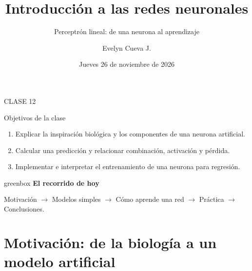 \documentclass[10pt,aspectratio=169,xcolor={dvipsnames}]{beamer}
\title[Clase 12 · Perceptrón lineal]{\bfseries Introducción a las redes neuronales}
\subtitle{Perceptrón lineal: de una neurona al aprendizaje}
\author[E. Cueva]{Evelyn Cueva J.}
\institute{Aprendizaje Automático Inicial · Ciencia de Datos}
\date[26 nov. 2026]{Jueves 26 de noviembre de 2026}
\newcommand{\tcg}[1]{\textcolor{verde}{#1}}
\newenvironment{caja}[1][lgraybox]{\begin{beamercolorbox}[sep=0.7em,wd=\linewidth]{#1}}{\end{beamercolorbox}}
\begin{document}
\begin{frame}[plain]
    \vspace{6mm}
    {\small CLASE 12\par}
    \vspace{6mm}
    {\LARGE\bfseries\inserttitle\par}
    \vspace{3mm}{\color{fondo}\rule{0.92\textwidth}{1pt}}\par
    \vspace{3mm}{\large\insertsubtitle\par}
    \vspace{8mm}\insertauthor\par
    \smallskip{\small\insertinstitute\par}
    \vspace{3mm}{\small\insertdate\par}
    \vfill
\end{frame}

\begin{frame}{Objetivos de la clase}
    \begin{enumerate}
        \item \tcg{Explicar} la inspiración biológica y los componentes de una neurona artificial.
        \item \tcg{Calcular} una predicción y relacionar combinación, activación y pérdida.
        \item \tcg{Implementar e interpretar} el entrenamiento de una neurona para regresión.
    \end{enumerate}
    \vspace{4mm}
    \begin{caja}[greenbox]
        \textbf{El recorrido de hoy}\par\medskip
        Motivación $\longrightarrow$ Modelos simples $\longrightarrow$ Cómo aprende una red
        $\longrightarrow$ Práctica $\longrightarrow$ Conclusiones.
    \end{caja}
\end{frame}

\section{Motivación: de la biología a un modelo artificial}
\end{document}
